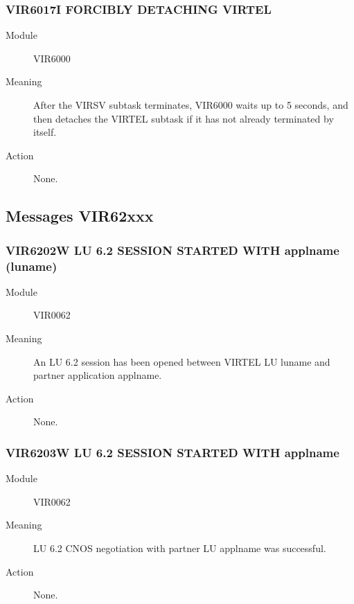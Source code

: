 \documentclass[letterpaper,10pt,english]{sphinxmanual}
\begin{document}
\subsubsection{VIR6017I FORCIBLY DETACHING VIRTEL}
\label{\detokenize{messages:vir6017i-forcibly-detaching-virtel}}\begin{description}
\item[{Module}] \leavevmode
VIR6000

\item[{Meaning}] \leavevmode
After the VIRSV subtask terminates, VIR6000 waits up to 5 seconds, and then detaches the VIRTEL subtask if it has not already terminated by itself.

\item[{Action}] \leavevmode
None.

\end{description}


\subsection{Messages VIR62xxx}
\label{\detokenize{messages:messages-vir62xxx}}

\subsubsection{VIR6202W LU 6.2 SESSION STARTED WITH applname (luname)}
\label{\detokenize{messages:vir6202w-lu-6-2-session-started-with-applname-luname}}\begin{description}
\item[{Module}] \leavevmode
VIR0062

\item[{Meaning}] \leavevmode
An LU 6.2 session has been opened between VIRTEL LU luname and partner application applname.

\item[{Action}] \leavevmode
None.

\end{description}


\subsubsection{VIR6203W LU 6.2 SESSION STARTED WITH applname}
\label{\detokenize{messages:vir6203w-lu-6-2-session-started-with-applname}}\begin{description}
\item[{Module}] \leavevmode
VIR0062

\item[{Meaning}] \leavevmode
LU 6.2 CNOS negotiation with partner LU applname was successful.

\item[{Action}] \leavevmode
None.

\end{description}
\end{document}
